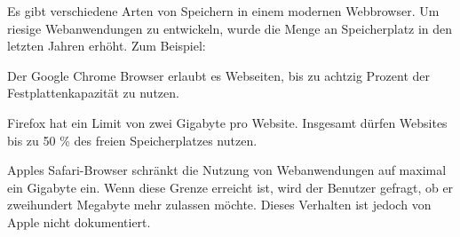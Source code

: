 

Es gibt verschiedene Arten von Speichern in einem modernen Webbrowser. Um riesige Webanwendungen zu entwickeln, wurde die Menge an Speicherplatz in den letzten Jahren erhöht. Zum Beispiel:

Der Google Chrome Browser erlaubt es Webseiten, bis zu achtzig Prozent der Festplattenkapazität zu nutzen.

Firefox hat ein Limit von zwei Gigabyte pro Website. Insgesamt dürfen Websites bis zu 50 \% des freien Speicherplatzes nutzen.

Apples Safari-Browser schränkt die Nutzung von Webanwendungen auf maximal ein Gigabyte ein. Wenn diese Grenze erreicht ist, wird der Benutzer gefragt, ob er zweihundert Megabyte mehr zulassen möchte. Dieses Verhalten ist jedoch von Apple nicht dokumentiert.






